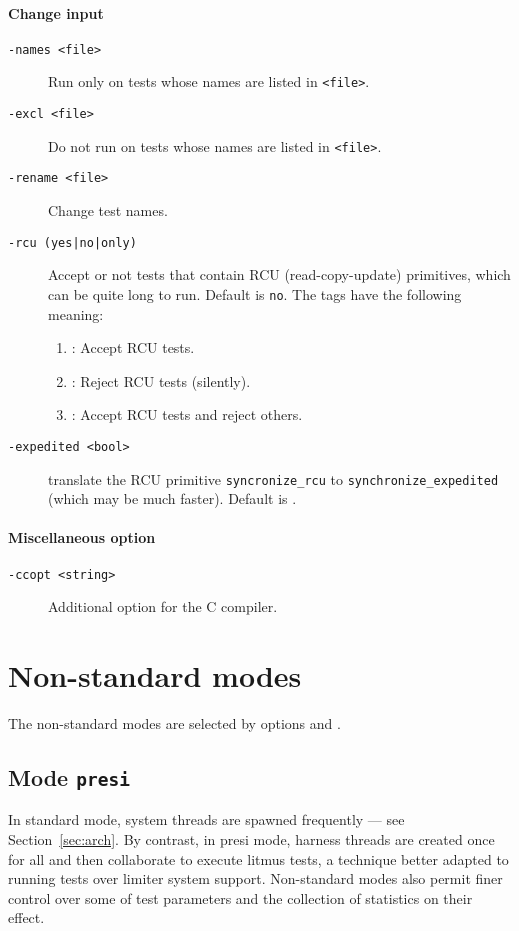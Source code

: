 \paragraph*{Change input}
\begin{description}
\item[{\tt -names <file>}] Run \litmus{} only on tests whose names are
listed in \texttt{<file>}.
\item[{\tt -excl <file>}] Do not run \litmus{} on tests whose names are
listed in \texttt{<file>}.
\item[{\tt -rename <file>}] Change test names.
\item[{\tt -rcu (yes|no|only)}]
Accept or not tests that contain RCU (read-copy-update) primitives,
which can be quite long to run. Default is \texttt{no}.
The tags have the following meaning:
\begin{enumerate}
\item {}: Accept RCU tests.
\item {}: Reject  RCU tests (silently).
\item {}: Accept RCU tests and reject others.
\end{enumerate}
\item[\tt -expedited <bool>]  translate the RCU primitive
\verb+syncronize_rcu+ to
\verb+synchronize_expedited+ (which may be much faster).
Default is .
\end{description}

\paragraph*{Miscellaneous option}
\begin{description}
\item[{\tt -ccopt <string>}]Additional option for the C compiler.
\end{description}

\section{\label{sec:nostd} Non-standard modes}
The non-standard modes are selected by \litmus{} options  and .

\subsection{\label{sec:presi}Mode \texttt{presi}}
In standard mode, system threads are spawned frequently
--- see Section~\ref{sec:arch}.
By contrast, in presi mode, harness threads  are created once for
all and then collaborate  to execute  litmus tests, a technique better
adapted to running tests over limiter system support. Non-standard
modes also permit finer control over some of test parameters and the
collection of statistics on their effect.

